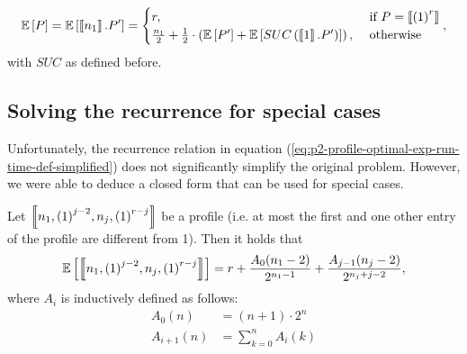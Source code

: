 \begin{equation}
  \label{eq:p2-profile-optimal-exp-run-time-def-simplified}
  \mathbb{E}\left[ P \right] =
  \mathbb{E}\left[ \left\llbracket n_1 \right\rrbracket . P' \right] =
  \begin{cases}
    r, & \text{ if } P= \left\llbracket {(1)}^{r} \right\rrbracket \\
    \frac{n_1}{2} + \frac{1}{2} \cdot \left( \mathbb{E}\left[ P' \right] + \mathbb{E}\left[ SUC\left(\left\llbracket 1 \right\rrbracket. P'\right) \right] \right) ,& \text{ otherwise } \\
  \end{cases},
\end{equation}
with $SUC$ as defined before. 

\subsection{Solving the recurrence for special cases}
\label{sec:p2-profile-exp-runtime-closed-form-spec-cases}

Unfortunately, the recurrence relation in equation (\ref{eq:p2-profile-optimal-exp-run-time-def-simplified}) does not significantly simplify the original problem. However, we were able to deduce a closed form that can be used for special cases.

\begin{theorem}
  \label{theo:simple-profiles-exp-runtime-for-p2-hlf}
  Let $\left\llbracket n_1,{(1)}^{j-2},n_j,{(1)}^{r-j} \right\rrbracket$ be a profile 
  (i.e. at most the first and one other entry of the profile are different from 1).
  Then it holds that
  \begin{equation*}
    \mathbb{E}\left[ \left\llbracket n_1,{(1)}^{j-2},n_j,{(1)}^{r-j} \right\rrbracket \right] = 
    r + \frac{A_0(n_1-2)}{2^{n_1-1}} + \frac{A_{j-1}(n_j-2)}{2^{n_j+j-2}},
  \end{equation*}
  where $A_i$ is inductively defined as follows:
  \begin{align*}
    A_0(n) & = (n+1) \cdot 2^n \\
    A_{i+1}(n) & = \sum_{k=0}^n A_{i}(k)
  \end{align*}
\end{theorem}

